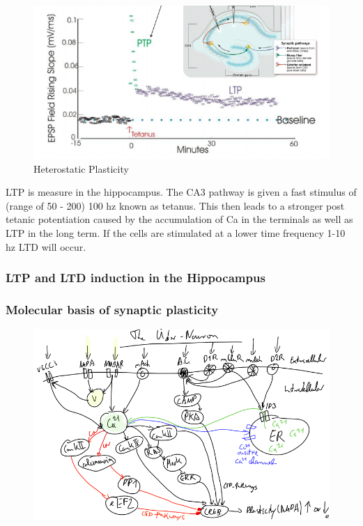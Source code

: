 \documentclass[main]{subfiles}
\begin{document}
\begin{figure}[H]
    \centering
    \includegraphics[width=.8\textwidth]{03_PlasticityInTheBrain/figures/pasted_image_11.png}
    \caption{Heterostatic Plasticity}
    \label{fig:syn_plas1t}
\end{figure}


LTP is measure in the hippocampus. The CA3 pathway is given a fast stimulus of (range of 50 - 200) 100 hz known as tetanus. This then leads to a stronger post tetanic potentiation caused by the accumulation of Ca in the terminals as well as LTP in the long term. If the cells are stimulated at a lower time frequency 1-10 hz LTD will occur. 




\subsubsection{LTP and LTD induction in the Hippocampus}
\subsubsection{Molecular basis of synaptic plasticity}

\begin{figure}[H]
    \centering
    \includegraphics[width=.8\textwidth]{03_PlasticityInTheBrain/figures/pasted_image_12.png}
    \caption{}
    \label{fig:syn_plas1t}
\end{figure}
\end{document}
